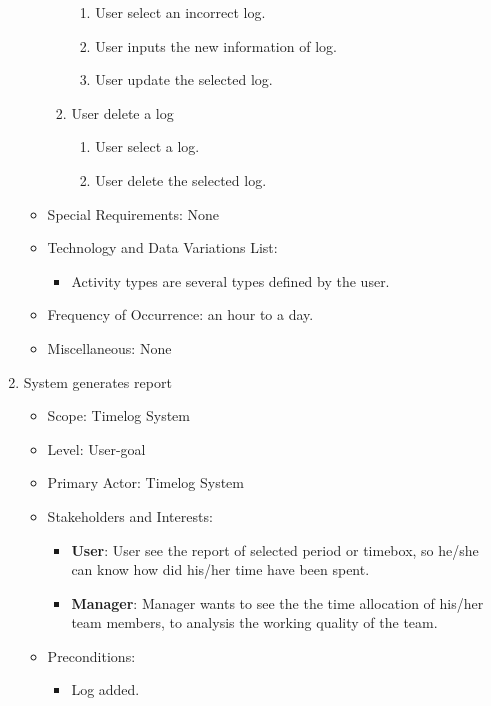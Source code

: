 \documentclass[12pt, a4paper]{article}
\begin{document}
\begin{CJK*}{UTF8}{bkai}
\begin{enumerate}
\begin{itemize}
\begin{enumerate}
\begin{enumerate}
                  \item User select an incorrect log.
                  \item User inputs the new information of log.
                  \item User update the selected log.
                \end{enumerate}
              \item User delete a log
                \begin{enumerate}
                  \item User select a log.
                  \item User delete the selected log.
                \end{enumerate}
            \end{enumerate}
          \item Special Requirements: None
          \item Technology and Data Variations List:
            \begin{itemize}
              \item Activity types are several types defined by the user.
            \end{itemize}
          \item Frequency of Occurrence: an hour to a day.
          \item Miscellaneous: None
        \end{itemize}
      \item System generates report
        \begin{itemize}
          \item Scope: Timelog System
          \item Level: User-goal
          \item Primary Actor: Timelog System
          \item Stakeholders and Interests:
            \begin{itemize}
              \item {\bf User}: User see the report of selected period or timebox, so he/she can know how did his/her time have been spent.
              \item {\bf Manager}: Manager wants to see the the time allocation of his/her team members, to analysis the working quality of the team.
            \end{itemize}
          \item Preconditions:
            \begin{itemize}
              \item Log added.

\end{itemize}
\end{itemize}
\end{enumerate}
\end{CJK*}
\end{document}
